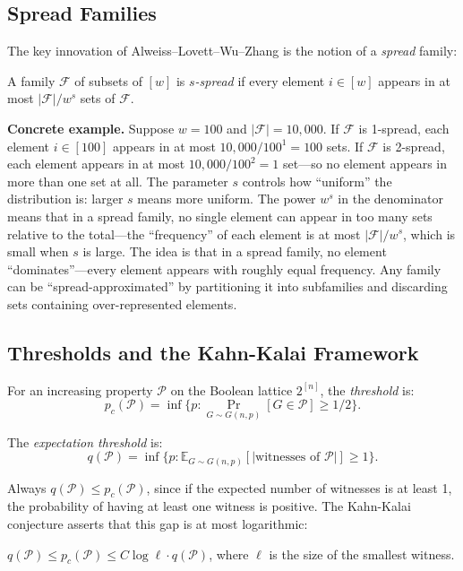 \subsection{Spread Families}

The key innovation of Alweiss--Lovett--Wu--Zhang is the notion of a \emph{spread} family:

\begin{definition}
A family $\mathcal{F}$ of subsets of $[w]$ is \emph{$s$-spread} if every element $i \in [w]$ appears in at most $|\mathcal{F}| / w^s$ sets of $\mathcal{F}$.
\end{definition}

\textbf{Concrete example.} Suppose $w = 100$ and $|\mathcal{F}| = 10{,}000$. If $\mathcal{F}$ is 1-spread, each element $i \in [100]$ appears in at most $10{,}000 / 100^1 = 100$ sets. If $\mathcal{F}$ is 2-spread, each element appears in at most $10{,}000 / 100^2 = 1$ set---so no element appears in more than one set at all. The parameter $s$ controls how ``uniform'' the distribution is: larger $s$ means more uniform. The power $w^s$ in the denominator means that in a spread family, no single element can appear in too many sets relative to the total---the ``frequency'' of each element is at most $|\mathcal{F}|/w^s$, which is small when $s$ is large. The idea is that in a spread family, no element ``dominates''---every element appears with roughly equal frequency. Any family can be ``spread-approximated'' by partitioning it into subfamilies and discarding sets containing over-represented elements.

\subsection{Thresholds and the Kahn-Kalai Framework}

For an increasing property $\mathcal{P}$ on the Boolean lattice $2^{[n]}$, the \emph{threshold} is:
\[
p_c(\mathcal{P}) = \inf\{p : \Pr_{G \sim G(n,p)}[G \in \mathcal{P}] \ge 1/2\}.
\]

The \emph{expectation threshold} is:
\[
q(\mathcal{P}) = \inf\{p : \mathbb{E}_{G \sim G(n,p)}[|\text{witnesses of } \mathcal{P}|] \ge 1\}.
\]

Always $q(\mathcal{P}) \le p_c(\mathcal{P})$, since if the expected number of witnesses is at least 1, the probability of having at least one witness is positive. The Kahn-Kalai conjecture asserts that this gap is at most logarithmic:

\begin{fact}
$q(\mathcal{P}) \le p_c(\mathcal{P}) \le C \log \ell \cdot q(\mathcal{P})$, where $\ell$ is the size of the smallest witness.
\end{fact}

